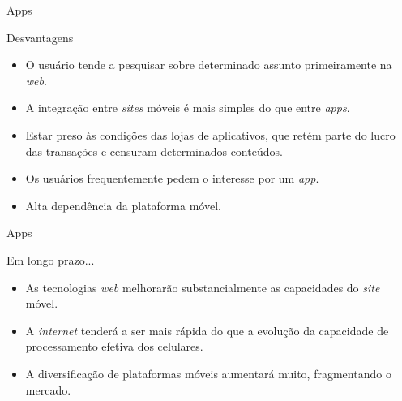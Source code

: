 \begin{frame}{Apps}
\begin{block}{Desvantagens}
  \begin{itemize}
    \item<1-> O usuário tende a pesquisar sobre determinado assunto primeiramente na \emph{web}.
    \item<2-> A integração entre \emph{sites} móveis é mais simples do que entre \emph{apps}.
    \item<3-> Estar preso às condições das lojas de aplicativos, que retém parte do lucro das transações e censuram determinados conteúdos.
    \item<4-> Os usuários frequentemente pedem o interesse por um \emph{app}.
    \item<5-> Alta dependência da plataforma móvel.
  \end{itemize}
\end{block}
\end{frame}

\begin{frame}{Apps}
\begin{block}{Em longo prazo...}
  \begin{itemize}
    \item<1-> As tecnologias \emph{web} melhorarão substancialmente as capacidades do \emph{site} móvel.
    \item<2-> A \emph{internet} tenderá a ser mais rápida do que a evolução da capacidade de processamento efetiva dos celulares.
    \item<3-> A diversificação de plataformas móveis aumentará muito, fragmentando o mercado.
  \end{itemize}
\end{block}
\end{frame}

